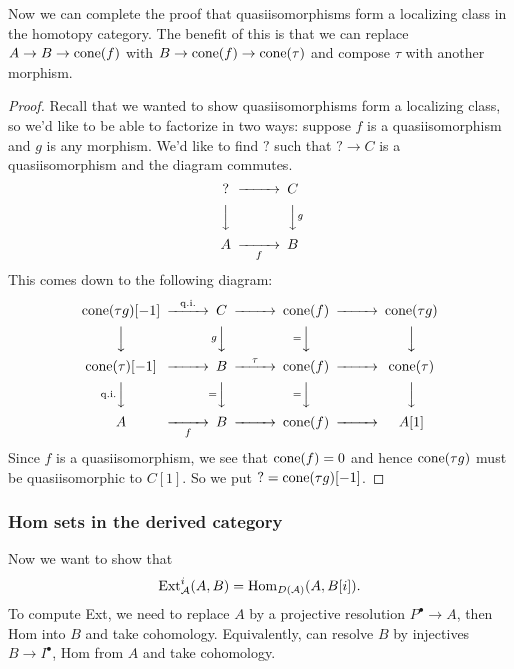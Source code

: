 Now we can complete the proof that quasiisomorphisms form a localizing class in the homotopy category. The benefit of this is that we can replace $A\to B\to\operatorname{cone}(f)$ with $B\to\operatorname{cone}(f)\to\operatorname{cone}(\tau)$ and compose $\tau$ with another morphism.
\begin{proof}
    Recall that we wanted to show quasiisomorphisms form a localizing class, so we'd like to be able to factorize in two ways: suppose $f$ is a quasiisomorphism and $g$ is any morphism. We'd like to find $?$ such that $?\to C$ is a quasiisomorphism and the diagram commutes.
    \begin{equation*}
        \begin{CD}
            ? @>>> C \\
            @VVV @VVgV \\
            A @>>f> B
        \end{CD}
    \end{equation*}
    This comes down to the following diagram:
    \begin{equation*}
        \begin{CD}
            \cone(\tau g)[-1] @>\qi>> C @>>> \cone(f) @>>> \cone(\tau g) \\
              @VVV @VgVV @V=VV @VVV \\
            \cone(\tau)[-1] @>>> B @>\tau>> \cone(f) @>>> \cone(\tau) \\
              @V\qi VV @V=VV @V=VV @VVV \\
            A @>>f> B @>>> \cone(f) @>>> A[1]
        \end{CD}
    \end{equation*}
    Since $f$ is a quasiisomorphism, we see that $\operatorname{cone}(f)=0$ and hence $\operatorname{cone}(\tau g)$ must be quasiisomorphic to $C[1]$. So we put $?=\operatorname{cone}(\tau g)[-1]$.
\end{proof}

\subsubsection{Hom sets in the derived category}

Now we want to show that
\begin{equation*}
    \operatorname{Ext}_{\mathcal{A}}^i(A,B) = \operatorname{Hom}_{D(\mathcal{A})}(A,B[i]).
\end{equation*}
To compute Ext, we need to replace $A$ by a projective resolution $P^\bullet\to A$, then Hom into $B$ and take cohomology. Equivalently, can resolve $B$ by injectives $B\to I^\bullet$, Hom from $A$ and take cohomology.

